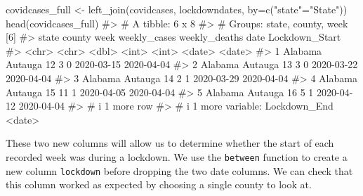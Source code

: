 \documentclass[
  letterpaper,
]{krantz}
\makeatletter
\newenvironment{Shaded}{\begin{snugshade}}{\end{snugshade}}
\newcommand{\AttributeTok}[1]{\textcolor[rgb]{0.40,0.45,0.13}{#1}}
\newcommand{\CommentTok}[1]{\textcolor[rgb]{0.37,0.37,0.37}{#1}}
\newcommand{\FunctionTok}[1]{\textcolor[rgb]{0.28,0.35,0.67}{#1}}
\newcommand{\NormalTok}[1]{\textcolor[rgb]{0.00,0.23,0.31}{#1}}
\newcommand{\OtherTok}[1]{\textcolor[rgb]{0.00,0.23,0.31}{#1}}
\newcommand{\StringTok}[1]{\textcolor[rgb]{0.13,0.47,0.30}{#1}}
\newenvironment{kframe}{%
\medskip{}
\setlength{\fboxsep}{.8em}
 \def\at@end@of@kframe{}%
 \ifinner\ifhmode%
  \def\at@end@of@kframe{\end{minipage}}%
  \begin{minipage}{\columnwidth}%
 \fi\fi%
 \def\FrameCommand##1{\hskip\@totalleftmargin \hskip-\fboxsep
 \colorbox{shadecolor}{##1}\hskip-\fboxsep
     \hskip-\linewidth \hskip-\@totalleftmargin \hskip\columnwidth}%
 \MakeFramed {\advance\hsize-\width
   \@totalleftmargin\z@ \linewidth\hsize
   \@setminipage}}%
 {\par\unskip\endMakeFramed%
 \at@end@of@kframe}
\renewenvironment{Shaded}{\begin{kframe}}{\end{kframe}}
\makeatother
\begin{document}
\begin{Shaded}
\begin{Highlighting}[]
\NormalTok{covidcases\_full }\OtherTok{\textless{}{-}} \FunctionTok{left\_join}\NormalTok{(covidcases, lockdowndates, }\AttributeTok{by=}\FunctionTok{c}\NormalTok{(}\StringTok{"state"}\OtherTok{=}\StringTok{"State"}\NormalTok{))}
\FunctionTok{head}\NormalTok{(covidcases\_full)}
\CommentTok{\#\textgreater{} \# A tibble: 6 x 8}
\CommentTok{\#\textgreater{} \# Groups:   state, county, week [6]}
\CommentTok{\#\textgreater{}   state   county   week weekly\_cases weekly\_deaths date       Lockdown\_Start}
\CommentTok{\#\textgreater{}   \textless{}chr\textgreater{}   \textless{}chr\textgreater{}   \textless{}dbl\textgreater{}        \textless{}int\textgreater{}         \textless{}int\textgreater{} \textless{}date\textgreater{}     \textless{}date\textgreater{}        }
\CommentTok{\#\textgreater{} 1 Alabama Autauga    12            3             0 2020{-}03{-}15 2020{-}04{-}04    }
\CommentTok{\#\textgreater{} 2 Alabama Autauga    13            3             0 2020{-}03{-}22 2020{-}04{-}04    }
\CommentTok{\#\textgreater{} 3 Alabama Autauga    14            2             1 2020{-}03{-}29 2020{-}04{-}04    }
\CommentTok{\#\textgreater{} 4 Alabama Autauga    15           11             1 2020{-}04{-}05 2020{-}04{-}04    }
\CommentTok{\#\textgreater{} 5 Alabama Autauga    16            5             1 2020{-}04{-}12 2020{-}04{-}04    }
\CommentTok{\#\textgreater{} \# i 1 more row}
\CommentTok{\#\textgreater{} \# i 1 more variable: Lockdown\_End \textless{}date\textgreater{}}
\end{Highlighting}
\end{Shaded}

These two new columns will allow us to determine whether the start of
each recorded week was during a lockdown. We use the \texttt{between}
function to create a new column \texttt{lockdown} before dropping the
two date columns. We can check that this column worked as expected by
choosing a single county to look at.
\end{document}
